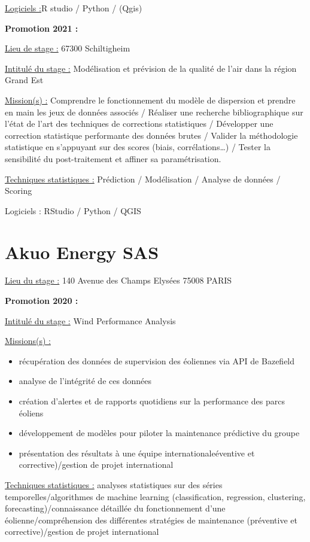 \documentclass[
  letterpaper,
  DIV=11,
  numbers=noendperiod]{scrreprt}
\begin{document}
\uline{Logiciels :}R studio / Python / (Qgis)

\textbf{Promotion 2021 :}

\uline{Lieu de stage :} 67300 Schiltigheim

\uline{Intitulé du stage :} Modélisation et prévision de la qualité de
l'air dans la région Grand Est

\uline{Mission(s) :} Comprendre le fonctionnement du modèle de
dispersion et prendre en main les jeux de données associés / Réaliser
une recherche bibliographique sur l'état de l'art des techniques de
corrections statistiques / Développer une correction statistique
performante des données brutes / Valider la méthodologie statistique en
s'appuyant sur des scores (biais, corrélations\ldots) / Tester la
sensibilité du post-traitement et affiner sa paramétrisation.

\uline{Techniques statistiques :} Prédiction / Modélisation / Analyse de
données / Scoring

Logiciels : RStudio / Python / QGIS

\hypertarget{akuo-energy-sas}{%
\section{\texorpdfstring{\textbf{Akuo Energy
SAS}}{Akuo Energy SAS}}\label{akuo-energy-sas}}

\uline{Lieu du stage :} 140 Avenue des Champs Elysées 75008 PARIS

\textbf{Promotion 2020 :}

\uline{Intitulé du stage :} Wind Performance Analysis

\uline{Missions(s) :}

\begin{itemize}
\item
  récupération des données de supervision des éoliennes via API de
  Bazefield
\item
  analyse de l'intégrité de ces données
\item
  création d'alertes et de rapports quotidiens sur la performance des
  parcs éoliens
\item
  développement de modèles pour piloter la maintenance prédictive du
  groupe
\item
  présentation des résultats à une équipe internationaleéventive et
  corrective)/gestion de projet international
\end{itemize}

\uline{Techniques statistiques :} analyses statistiques sur des séries
temporelles/algorithmes de machine learning (classification, regression,
clustering, forecasting)/connaissance détaillée du fonctionnement d'une
éolienne/compréhension des différentes stratégies de maintenance
(préventive et corrective)/gestion de projet international
\end{document}
